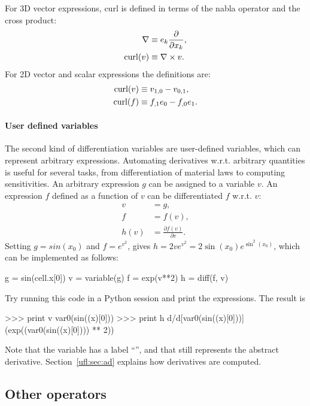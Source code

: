 For 3D vector expressions, curl is defined in terms of the nabla operator
and the cross product:
\begin{align}
  \nabla &\equiv {e}_k \frac{\partial}{\partial x_k}, \\
  \operatorname{curl}({v}) &\equiv \nabla \times {v}.
\end{align}
For 2D vector and scalar expressions the definitions are:
\begin{align}
  \operatorname{curl}({v}) &\equiv v_{1,0} - v_{0,1}, \\
  \operatorname{curl}(f)   &\equiv f_{,1}{e}_0 - f_{,0}{e}_1.
\end{align}

\paragraph{User defined variables}
\label{ufl:sec:diff}

The second kind of differentiation variables are user-defined
variables, which can represent arbitrary expressions.  Automating
derivatives w.r.t. arbitrary quantities is useful for several tasks, from
differentiation of material laws to computing sensitivities.  An arbitrary
expression $g$ can be assigned to a variable $v$.  An expression $f$
defined as a function of $v$ can be differentiated $f$ w.r.t. $v$:
\begin{align}
v &= g, \\
f &= f(v), \\
h(v) &= \frac{\partial f(v)}{\partial v}.
\end{align}
Setting $g = sin(x_0)$ and $f = e^{v^2}$, gives $h = 2 v e^{v^2} =
2 \sin(x_0) e^{\sin^2(x_0)}$, which can be implemented as follows:
\begin{uflcode}
g = sin(cell.x[0])
v = variable(g)
f = exp(v**2)
h = diff(f, v)
\end{uflcode}
Try running this code in a Python session and print the expressions.
The result is
\begin{python}
>>> print v
var0(sin((x)[0]))
>>> print h
d/d[var0(sin((x)[0]))] (exp((var0(sin((x)[0]))) ** 2))
\end{python}
Note that the variable has a label ``'', and that 
still represents the abstract derivative.  Section~\ref{ufl:sec:ad}
explains how derivatives are computed.

\subsection{Other operators}
\label{ufl:sec:conditionals}

